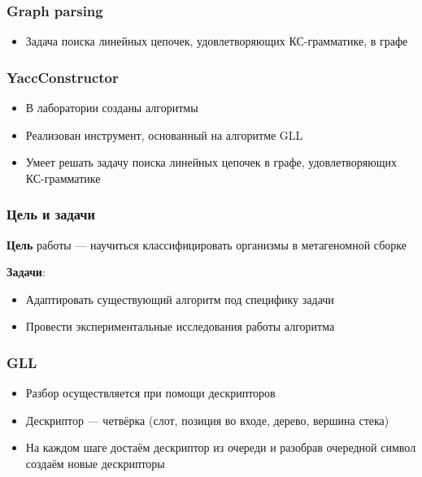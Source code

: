 \documentclass{beamer}
\begin{document}
    \begin{frame}
        \frametitle{Graph parsing}
        \begin{itemize}
            \item Задача поиска линейных цепочек, удовлетворяющих КС-грамматике, в графе
        \end{itemize}
    \end{frame}
    
    \begin{frame}
        \frametitle{YaccConstructor}
        \begin{itemize}
            \item В лаборатории созданы алгоритмы
            \item Реализован инструмент, основанный на алгоритме GLL
            \item Умеет решать задачу поиска линейных цепочек в графе, удовлетворяющих КС-грамматике
        \end{itemize}
    \end{frame}
    
    \begin{frame}
        \frametitle{Цель и задачи}
        \textbf{Цель} работы --- научиться классифицировать организмы в метагеномной сборке
        
        \textbf{Задачи}:
        \begin{itemize}
            \item Адаптировать существующий алгоритм под специфику задачи
            \item Провести экспериментальные исследования работы алгоритма
        \end{itemize}
    \end{frame}
    
    \begin{frame}
        \frametitle{GLL}
        \begin{itemize}
            \item Разбор осуществляется при помощи дескрипторов
            \item Дескриптор --- четвёрка (слот, позиция во входе, дерево, вершина стека)
            \item На каждом шаге достаём дескриптор из очереди и разобрав очередной символ создаём новые дескрипторы
        \end{itemize}
    \end{frame}
    
\end{document}
